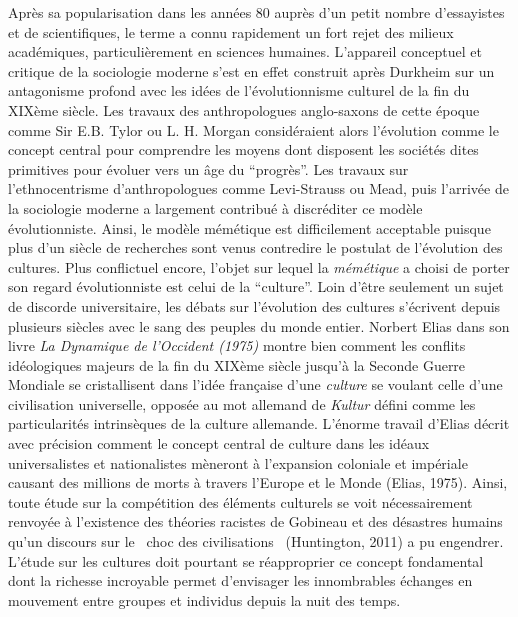 Apr\`es sa popularisation dans les ann\'ees 80 aupr\`es d{\textquoteright}un petit nombre d{\textquoteright}essayistes et de scientifiques, le terme a connu rapidement un fort rejet des milieux acad\'emiques, particuli\`erement en sciences humaines. L{\textquoteright}appareil conceptuel et critique de la sociologie moderne s{\textquoteright}est en effet construit apr\`es Durkheim sur un antagonisme profond avec les id\'ees de l{\textquoteright}\'evolutionnisme culturel de la fin du XIX\`eme si\`ecle. Les travaux des anthropologues anglo-saxons de cette \'epoque comme Sir E.B. Tylor ou L. H. Morgan consid\'eraient alors l{\textquoteright}\'evolution comme le concept central pour comprendre les moyens dont disposent les soci\'et\'es dites primitives pour \'evoluer vers un \^age du {\textquotedblleft}progr\`es{\textquotedblright}. Les travaux sur l{\textquoteright}ethnocentrisme d{\textquoteright}anthropologues comme Levi-Strauss ou Mead, puis l{\textquoteright}arriv\'ee de la sociologie moderne a largement contribu\'e \`a discr\'editer ce mod\`ele \'evolutionniste. Ainsi, le mod\`ele m\'em\'etique est difficilement acceptable puisque plus d{\textquoteright}un si\`ecle de recherches sont venus contredire le postulat de l{\textquoteright}\'evolution des cultures. Plus conflictuel encore, l{\textquoteright}objet sur lequel la \textit{m\'em\'etique} a choisi de porter son regard \'evolutionniste est celui de la {\textquotedblleft}culture{\textquotedblright}. Loin d{\textquoteright}\^etre seulement un sujet de discorde universitaire, les d\'ebats sur l{\textquoteright}\'evolution des cultures s{\textquoteright}\'ecrivent depuis plusieurs si\`ecles avec le sang des peuples du monde entier. Norbert Elias dans son livre \textit{La Dynamique de l{\textquoteright}Occident (1975) }montre bien comment les conflits id\'eologiques majeurs de la fin du XIX\`eme si\`ecle jusqu{\textquoteright}\`a la Seconde Guerre Mondiale se cristallisent dans l{\textquoteright}id\'ee fran\c{c}aise d{\textquoteright}une \textit{culture} se voulant celle d{\textquoteright}une civilisation universelle, oppos\'ee au mot allemand de \textit{Kultur} d\'efini comme les particularit\'es intrins\`eques de la culture allemande. L{\textquoteright}\'enorme travail d{\textquoteright}Elias d\'ecrit avec pr\'ecision comment le concept central de culture dans les id\'eaux universalistes et nationalistes m\`eneront \`a l{\textquoteright}expansion coloniale et imp\'eriale causant des millions de morts \`a travers l{\textquoteright}Europe et le Monde (Elias, 1975). Ainsi, toute \'etude sur la comp\'etition des \'el\'ements culturels se voit n\'ecessairement renvoy\'ee \`a l{\textquoteright}existence des th\'eories racistes de Gobineau et des d\'esastres humains qu{\textquoteright}un discours sur le {\guillemotleft}~choc des civilisations~{\guillemotright} (Huntington, 2011) a pu engendrer. L{\textquoteright}\'etude sur les cultures doit pourtant se r\'eapproprier ce concept fondamental dont la richesse incroyable permet d{\textquoteright}envisager les innombrables \'echanges en mouvement entre groupes et individus depuis la nuit des temps. 
